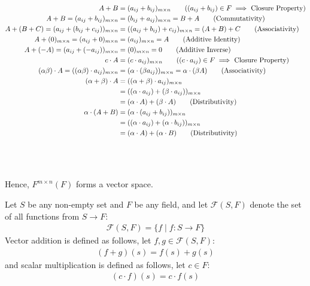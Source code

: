 \documentclass[12pt]{ipu-math}
\begin{document}
    \begin{align*}
        A + B
        &= (a_{ij} + b_{ij})_{m\times{n}}
        \tag{$(a_{ij} + b_{ij}) \in F \implies$ Closure Property}\\
        A + B
        = (a_{ij} + b_{ij})_{m\times{n}}
        &= (b_{ij} + a_{ij})_{m\times{n}}
        = B + A \tag{Commutativity}\\
        A + (B + C)
        = (a_{ij} + (b_{ij} + c_{ij}))_{m\times{n}}
        &= ((a_{ij} + b_{ij}) + c_{ij})_{m\times{n}}
        = (A + B) + C \tag{Associativity}\\
        A + (0)_{m\times{n}}
        = (a_{ij} + 0)_{m\times{n}}
        &= (a_{ij})_{m\times{n}}
        = A \tag{Additive Identity}\\
        A + (-A)
        = (a_{ij} + (-a_{ij}))_{m\times{n}}
        &= (0)_{m\times{n}}
        = 0 \tag{Additive Inverse}\\
        c\cdot A
        &= (c\cdot a_{ij})_{m\times{n}}
        \tag{$(c\cdot a_{ij}) \in F \implies$ Closure Property}\\
        (\alpha\beta)\cdot A
        = ((\alpha\beta)\cdot a_{ij})_{m\times{n}}
        &= (\alpha\cdot(\beta a_{ij}))_{m\times{n}}
        =\alpha\cdot(\beta A) \tag{Associativity}\\
        (\alpha + \beta)\cdot A
        &= ((\alpha + \beta)\cdot a_{ij})_{m\times{n}}\\
        &= ((\alpha\cdot{a_{ij}}) + (\beta\cdot{a_{ij}}))_{m\times{n}}\\
        &=(\alpha\cdot{A}) + (\beta\cdot{A}) \tag{Distributivity}\\
        \alpha\cdot(A + B)
        &= (\alpha\cdot(a_{ij} + b_{ij}))_{m\times{n}}\\
        &= ((\alpha\cdot a_{ij}) + (\alpha\cdot b_{ij}))_{m\times{n}}\\
        &=(\alpha\cdot{A}) + (\alpha\cdot{B}) \tag{Distributivity}
    \end{align*}

    \\~

    Hence, $F^{m\times{n}}(F)$ forms a vector space.

    \newpage
    \example
    Let $S$ be any non-empty set and $F$ be any field, and let $\mathcal{F}(S,F)$ denote the set of all functions from
    $S \rightarrow F$:%
    \begin{align*}%
        \mathcal{F}(S,F) = \{f \mid f: S\rightarrow F\}
    \end{align*}%
    Vector addition is defined as follows, let $f,g \in \mathcal{F}(S,F)$:%
    \begin{align*}%
    (f+g)(s)
        = f(s) + g(s)\tag{$\forall s \in S$}
    \end{align*}%
    and scalar multiplication is defined as follows, let $c \in F$:%
    \begin{align*}
    (c\cdot{f})(s)
        = c\cdot{f(s)}
    \end{align*}
\end{document}
